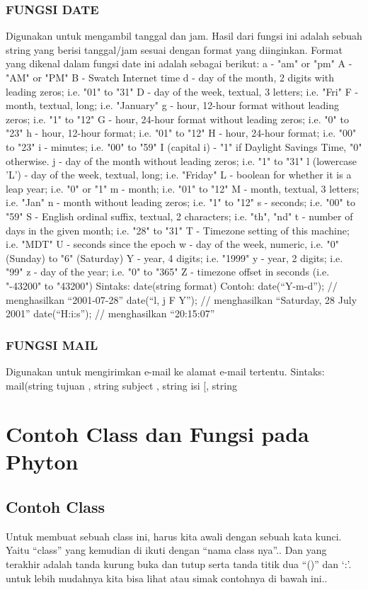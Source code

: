 \subsubsection{FUNGSI DATE}
Digunakan untuk mengambil tanggal dan jam. Hasil dari fungsi ini adalah sebuah string
yang berisi tanggal/jam sesuai dengan format yang diinginkan. Format yang dikenal
dalam fungsi date ini adalah sebagai berikut:
a - "am" or "pm"
A - "AM" or "PM"
B - Swatch Internet time
d - day of the month, 2 digits with leading zeros; i.e. "01" to "31"
D - day of the week, textual, 3 letters; i.e. "Fri"
F - month, textual, long; i.e. "January"
g - hour, 12-hour format without leading zeros; i.e. "1" to "12"
G - hour, 24-hour format without leading zeros; i.e. "0" to "23"
h - hour, 12-hour format; i.e. "01" to "12"
H - hour, 24-hour format; i.e. "00" to "23"
i - minutes; i.e. "00" to "59"
I (capital i) - "1" if Daylight Savings Time, "0" otherwise.
j - day of the month without leading zeros; i.e. "1" to "31"
l (lowercase 'L') - day of the week, textual, long; i.e. "Friday"
L - boolean for whether it is a leap year; i.e. "0" or "1"
m - month; i.e. "01" to "12"
M - month, textual, 3 letters; i.e. "Jan"
n - month without leading zeros; i.e. "1" to "12"
s - seconds; i.e. "00" to "59"
S - English ordinal suffix, textual, 2 characters; i.e. "th", "nd"
t - number of days in the given month; i.e. "28" to "31"
T - Timezone setting of this machine; i.e. "MDT"
U - seconds since the epoch
w - day of the week, numeric, i.e. "0" (Sunday) to "6" (Saturday)
Y - year, 4 digits; i.e. "1999"
y - year, 2 digits; i.e. "99"
z - day of the year; i.e. "0" to "365"
Z - timezone offset in seconds (i.e. "-43200" to "43200")
Sintaks:
date(string format)
Contoh:
date(“Y-m-d”); // menghasilkan “2001-07-28”
date(“l, j F Y”); // menghasilkan “Saturday, 28 July 2001”
date(“H:i:s”); // menghasilkan “20:15:07”
\subsubsection{FUNGSI MAIL}
Digunakan untuk mengirimkan e-mail ke alamat e-mail tertentu.
Sintaks:
mail(string tujuan , string subject , string isi [, string

\section{Contoh Class dan Fungsi pada Phyton}
\subsection{Contoh Class}
Untuk membuat sebuah class ini, harus kita awali dengan sebuah kata kunci. Yaitu “class” yang kemudian di ikuti dengan 
“nama class nya”.. Dan yang terakhir adalah tanda kurung buka dan tutup serta tanda titik dua “()” dan ‘:’.  untuk lebih
mudahnya kita bisa lihat atau simak contohnya di bawah ini..

